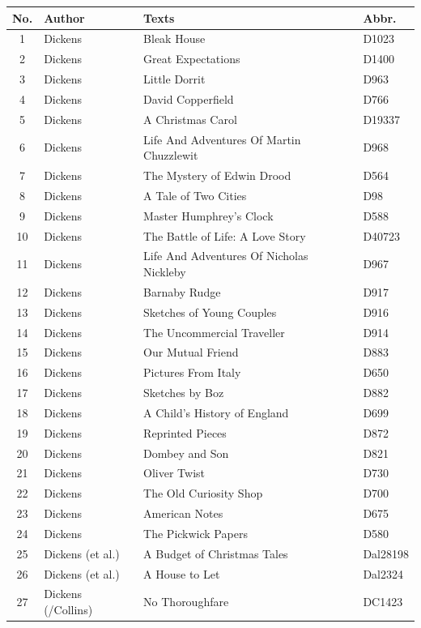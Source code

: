 \documentclass[a4paper,10pt,twoside,fleqn]{article}
\begin{document}
\begin{table}[!ht]
      \label{table:Dickens-data}
      \small
\begin{tabular}{c l l l} \\\hline \hline
\textbf{No.} 	& \textbf{Author} 	& \textbf{Texts} 			& \textbf{Abbr.} \\ \hline
1   		& Dickens 		& Bleak House 				& D1023     \\
2   		& Dickens		& Great Expectations			& D1400      \\
3		& Dickens      		& Little Dorrit     			& D963       \\
4		& Dickens      		& David Copperfield     		& D766        \\
5		& Dickens      		& A Christmas Carol     		& D19337       \\
6   		& Dickens		& Life And Adventures Of Martin Chuzzlewit	& D968        \\
7		& Dickens		& The Mystery of Edwin Drood		& D564   \\
8		& Dickens      		& A Tale of Two Cities                  & D98      \\
9		& Dickens		& Master Humphrey's Clock		& D588           \\
10		& Dickens		& The Battle of Life: A Love Story      & D40723              \\
11		& Dickens		& Life And Adventures Of Nicholas Nickleby	& D967          \\  
12		& Dickens		& Barnaby Rudge      			& D917             \\
13		& Dickens		& Sketches of Young Couples		& D916        \\
14		& Dickens		& The Uncommercial Traveller            & D914           \\
15		& Dickens		& Our Mutual Friend			& D883           \\
16		& Dickens		& Pictures From Italy			& D650    \\
17		& Dickens		& Sketches by Boz			& D882      \\
18		& Dickens		& A Child's History of England       	& D699  \\
19		& Dickens		& Reprinted Pieces			& D872   \\
20		& Dickens		& Dombey and Son			& D821     \\
21		& Dickens		& Oliver Twist				& D730        \\
22		& Dickens		&The Old Curiosity Shop			& D700         \\
23		& Dickens		& American Notes			& D675         \\
24		& Dickens		&The Pickwick Papers			& D580           \\
25		& Dickens    (et al.)   & A Budget of Christmas Tales		& Dal28198         \\
26		& Dickens (et al.)	& A House to Let			& Dal2324     \\
27		& Dickens (/Collins)     & No Thoroughfare			& DC1423       \\ \bottomrule
\end{tabular}
\end{table}
\end{document}
